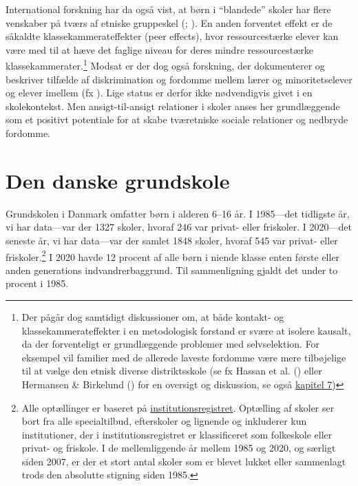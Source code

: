 \documentclass[
]{book}
\begin{document}
International forskning har da også vist, at børn i ``blandede'' skoler har flere venskaber på tværs af etniske gruppeskel (; ). En anden forventet effekt er de såkaldte klassekammerateffekter (peer effects), hvor ressourcestærke elever kan være med til at hæve det faglige niveau for deres mindre ressourcestærke klassekammerater.\footnote{Der pågår dog samtidigt diskussioner om, at både kontakt- og klassekammerateffekter i en metodologisk forstand er svære at isolere kausalt, da der forventeligt er grundlæggende problemer med selvselektion. For eksempel vil familier med de allerede laveste fordomme være mere tilbøjelige til at vælge den etnisk diverse distriktsskole (se fx Hassan et al. () eller Hermansen \& Birkelund () for en oversigt og diskussion, se også \hyperref[kap7]{kapitel 7})} Modsat er der dog også forskning, der dokumenterer og beskriver tilfælde af diskrimination og fordomme mellem lærer og minoritetselever og elever imellem (fx ). Lige status er derfor ikke nødvendigvis givet i en skolekontekst. Men ansigt-til-ansigt relationer i skoler anses her grundlæggende som et positivt potentiale for at skabe tværetniske sociale relationer og nedbryde fordomme.

\section{Den danske grundskole}\label{den-danske-grundskole}

Grundskolen i Danmark omfatter børn i alderen 6--16 år. I 1985---det tidligste år, vi har data---var der 1327 skoler, hvoraf 246 var privat- eller friskoler. I 2020---det seneste år, vi har data---var der samlet 1848 skoler, hvoraf 545 var privat- eller friskoler.\footnote{Alle optællinger er baseret på \href{https://data.stil.dk/InstregV2/Default.aspx?ReturnUrl=\%2finstregv2\%2f&AspxAutoDetectCookieSupport=1}{institutionsregistret}. Optælling af skoler ser bort fra alle specialtilbud, efterskoler og lignende og inkluderer kun institutioner, der i institutionsregistret er klassificeret som folkeskole eller privat- og friskole. I de mellemliggende år mellem 1985 og 2020, og særligt siden 2007, er der et stort antal skoler som er blevet lukket eller sammenlagt trods den absolutte stigning siden 1985.} I 2020 havde 12 procent af alle børn i niende klasse enten første eller anden generations indvandrerbaggrund. Til sammenligning gjaldt det under to procent i 1985.
\end{document}
